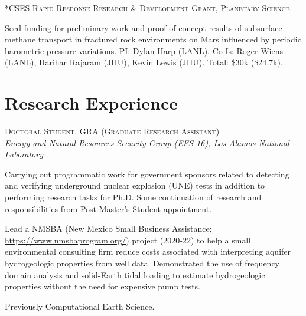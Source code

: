\documentclass[11pt, letterpaper]{article}
\newcommand{\years}[1]{\marginnote{\scriptsize #1}}
\begin{document}
\years{2020}\textsc{*CSES Rapid Response Research \& Development Grant, Planetary
Science}
\begin{adjustwidth}{5pt}{0pt}
	Seed funding for preliminary work and proof-of-concept results of
	subsurface methane transport in fractured rock environments on Mars
	influenced by periodic barometric pressure variations.
	PI: Dylan Harp (LANL). Co-Is: Roger Wiens (LANL), Harihar Rajaram (JHU),
	Kevin Lewis (JHU). Total: \$30k (\$24.7k). %
\end{adjustwidth}


\section*{Research Experience}
\noindent
\years{2020 - pres.}\textsc{Doctoral Student, GRA (Graduate Research Assistant)}\\
\textit{Energy and Natural Resources Security Group (EES-16), Los Alamos National Laboratory}
\begin{adjustwidth}{5pt}{0pt}
	Carrying out programmatic work for government sponsors related to detecting
	and verifying underground nuclear explosion (UNE) tests in addition to
	performing research tasks for Ph.D. Some  continuation of research and
	responsibilities from Post-Master's Student appointment.
	
	Lead a NMSBA (New Mexico Small Business Assistance;
	\href{https://www.nmsbaprogram.org/}{https://www.nmsbaprogram.org/})
	project (2020-22) to help a small environmental consulting firm reduce
	costs associated with interpreting aquifer hydrogeologic properties from
	well data.  Demonstrated the use of frequency domain analysis and
	solid-Earth tidal loading to estimate hydrogeologic properties without the
	need for expensive pump tests. 

	Previously Computational Earth Science.
\end{adjustwidth}
\end{document}
